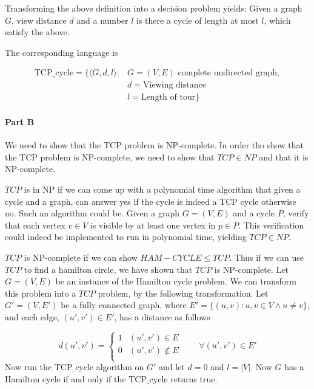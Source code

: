 \documentclass[10pt]{article}
\begin{document}
Transforming the above definition into a decision problem yields: Given a graph $G$, view distance $d$ and a number $l$ is there a cycle of length at most $l$, which satisfy the above.

The corresponding language is

\begin{align*}
   \text{TCP_cycle} = \{ \langle G, d, l \rangle : &G = (V,E) \text{ complete undirected graph},\\ 
                                                   &d = \text{Viewing distance}  \\
                                                   &l = \text{Length of tour}  \}
\end{align*}


\paragraph{Part B} %
\label{par:part_b}
We need to show that the TCP problem is NP-complete. In order tho show that the TCP problem is NP-complete, we need to show that $TCP \in NP$ and that it is NP-complete. 

$TCP$ is in NP if we can come up with a polynomial time algorithm that given a cycle and a graph, can answer yes if the cycle is indeed a TCP cycle otherwise no. Such an algorithm could be. Given a graph $G=(V,E)$ and a cycle $P$, verify that each vertex $v \in V$ is visible by at least one vertex in $p \in P$. This verification could indeed be implemented to run in polynomial time, yielding $TCP \in NP$.

$TCP$ is NP-complete if we can show $HAM-CYCLE \leq TCP$. Thus if we can use $TCP$ to find a hamilton circle, we have shown that $TCP$ is NP-complete. Let $G = (V, E)$ be an instance of the Hamilton cycle problem. We can transform this problem into a $TCP$ problem, by the following transformation. Let $G' = (V, E')$ be a fully connected graph, where $E' = \{(u,v) : u,v \in V \wedge u \neq v\}$, and each edge, $(u',v') \in E'$, has a distance as follows

\begin{equation} 
d(u',v')  = 
\left\{
\begin{array}{rl} 
  1 & (u',v') \in E\\
  0 & (u',v') \notin E\\ 
\end{array} 
\right. \qquad \forall (u',v') \in E'
\end{equation} 
Now run the $\text{TCP_cycle}$ algorithm on $G'$ and let $d=0$ and $l = |V|$. Now $G$ has a Hamilton cycle if and only if the $\text{TCP_cycle}$ returns true.
\end{document}
